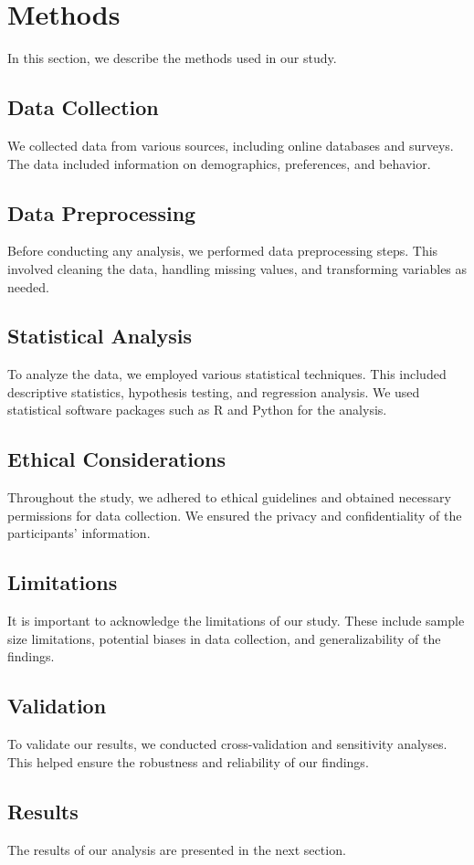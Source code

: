 \section{Methods}

In this section, we describe the methods used in our study.

\subsection{Data Collection}

We collected data from various sources, including online databases and surveys. The data included information on demographics, preferences, and behavior.

\subsection{Data Preprocessing}

Before conducting any analysis, we performed data preprocessing steps. This involved cleaning the data, handling missing values, and transforming variables as needed.

\subsection{Statistical Analysis}

To analyze the data, we employed various statistical techniques. This included descriptive statistics, hypothesis testing, and regression analysis. We used statistical software packages such as R and Python for the analysis.

\subsection{Ethical Considerations}

Throughout the study, we adhered to ethical guidelines and obtained necessary permissions for data collection. We ensured the privacy and confidentiality of the participants' information.

\subsection{Limitations}

It is important to acknowledge the limitations of our study. These include sample size limitations, potential biases in data collection, and generalizability of the findings.

\subsection{Validation}

To validate our results, we conducted cross-validation and sensitivity analyses. This helped ensure the robustness and reliability of our findings.

\subsection{Results}

The results of our analysis are presented in the next section.
